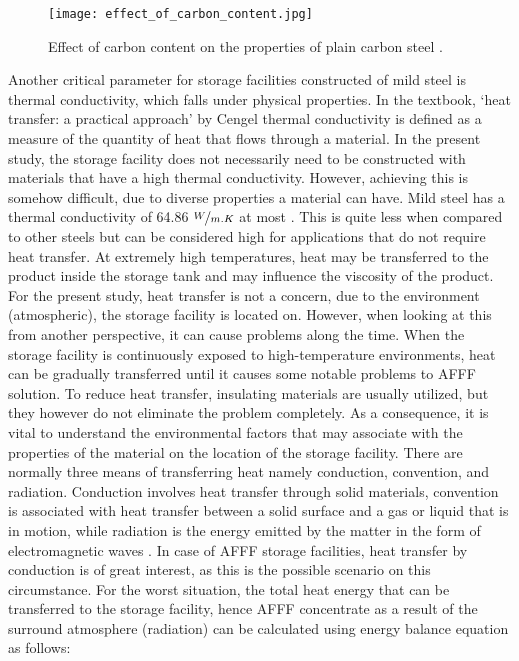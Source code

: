 \begin{figure}[H]
    \centering
    \texttt{[image: effect\_of\_carbon\_content.jpg]}
    \caption{Effect of carbon content on the properties of plain carbon steel \cite{timings2008fabrication}.}
    \label{ch3:figure:carbon}
\end{figure}

Another critical parameter for storage facilities constructed of mild steel is thermal conductivity, which falls under physical properties. In the textbook, ‘heat transfer: a practical approach’ by Cengel \cite{cengel1998heat} thermal conductivity is defined as a measure of the quantity of heat that flows through a material. In the present study, the storage facility does not necessarily need to be constructed with materials that have a high thermal conductivity. However, achieving this is somehow difficult, due to diverse properties a material can have.
Mild steel has a thermal conductivity of 64.86 $\nicefrac{W}{m.K}$ at most \cite{cengel1998heat}. This is quite less when compared to other steels but can be considered high for applications that do not require heat transfer. At extremely high temperatures, heat may be transferred to the product inside the storage tank and may influence the viscosity of the product. For the present study, heat transfer is not a concern, due to the environment (atmospheric), the storage facility is located on. However, when looking at this from another perspective, it can cause problems along the time. When the storage facility is continuously exposed to high-temperature environments, heat can be gradually transferred until it causes some notable problems to AFFF solution. To reduce heat transfer, insulating materials are usually utilized, but they however do not eliminate the problem completely. As a consequence, it is vital to understand the environmental factors that may associate with the properties of the material on the location of the storage facility.
There are normally three means of transferring heat namely conduction, convention, and radiation. Conduction involves heat transfer through solid materials, convention is associated with heat transfer between a solid surface and a gas or liquid that is in motion, while radiation is the energy emitted by the matter in the form of electromagnetic waves \cite{cengel1998heat}. In case of AFFF storage facilities, heat transfer by conduction is of great interest, as this is the possible scenario on this circumstance.   
For the worst situation, the total heat energy that can be transferred to the storage facility, hence AFFF concentrate as a result of the surround atmosphere (radiation) can be calculated using energy balance equation as follows:

